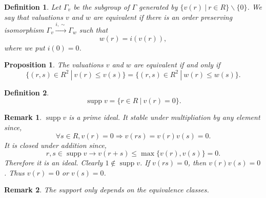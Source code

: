 \documentclass[8pt]{article}
\numberwithin{equation}{section}
\newtheorem{proposition}{Proposition}[subsection]
\newtheorem{definition}{Definition}[subsection]
\newtheorem{remark}{Remark}[subsection]
\DeclareMathOperator{\supp}{supp}
\newcommand{\sep}[0]{\:|\:}
\begin{document}
\begin{definition}
    \label{definition_5_3}
    Let $\Gamma_v$ be the subgroup of $\Gamma$ generated by $\{v(r)\sep r\in R\}\backslash\{0\}$.
    We say that valuations $v$ and $w$ are equivalent if there is an order preserving isomorphism $\Gamma_v\stackrel{i, \sim}{\to}\Gamma_w$ such that 
    \begin{equation*}
        w(r) = i(v(r)),
    \end{equation*}
    where we put $i(0)=0$.
\end{definition}
\begin{proposition}
    \label{fact_5_1}
    The valuations $v$ and $w$ are equivalent if and only if 
    \begin{equation*}
        \{(r,s)\in R^2\sep v(r)\leq v(s)\} = \{(r,s)\in R^2\sep w(r)\leq w(s)\}.
    \end{equation*}
\end{proposition}
\begin{definition}
    \begin{equation*}
        \supp v = \{r\in R\sep v(r) = 0\}.
    \end{equation*}
    \label{definition_5_4}
\end{definition}
\begin{remark}
    $\supp v$ is a prime ideal. It stable under multipliation by any element since,
    \begin{equation*}
        \forall s\in R, v(r)=0\Rightarrow v(rs) = v(r)v(s) = 0.
    \end{equation*}
    It is closed under addition since,
    \begin{equation*}
        r,s\in\supp v\rightarrow v(r+s) \leq\max\{v(r),v(s)\} = 0.
    \end{equation*}
    Therefore it is an ideal. Clearly $1\not\in\supp v$. If $v(rs) = 0$, then $v(r)v(s) = 0$. Thus $v(r) = 0$ or $v(s) = 0$. 
\end{remark}
\begin{remark}
    The support only depends on the equivalence classes.
\end{remark}
\end{document}
